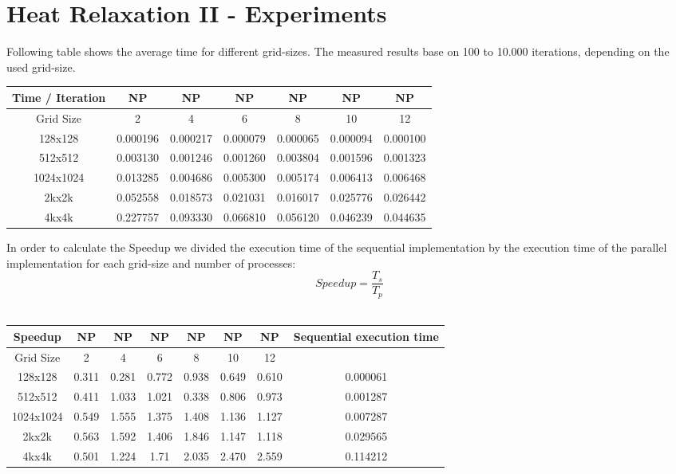 \documentclass{article}
\newcommand{\enterProblemHeader}[1]{
}
\newcommand{\exitProblemHeader}[1]{
}
\newcounter{homeworkProblemCounter} %
\newcommand{\homeworkProblemName}{}
\newenvironment{homeworkProblem}[1][Problem \arabic{homeworkProblemCounter}]{ %
\stepcounter{homeworkProblemCounter} %
\renewcommand{\homeworkProblemName}{#1} %
\section{\homeworkProblemName} %
}{
}
\begin{document}
\begin{homeworkProblem}[Heat Relaxation II - Experiments]
Following table shows the average time for different grid-sizes. The measured results
base on 100 to 10.000 iterations, depending on the used grid-size.\\
\begin{center}
\begin{tabular}{ |c|c|c|c|c|c|c| }
\hline 
\textbf{Time / Iteration} & NP & NP & NP & NP & NP & NP\\
\hline
Grid Size & 2 & 4 & 6 & 8 & 10 & 12\\
\hline
128x128 & 0.000196 & 0.000217 & 0.000079 & 0.000065 & 0.000094 & 0.000100\\ 
\hline
512x512 & 0.003130 & 0.001246 & 0.001260 & 0.003804 & 0.001596 & 0.001323\\ 
\hline
1024x1024 & 0.013285 & 0.004686 & 0.005300 & 0.005174 & 0.006413 & 0.006468 \\ 
\hline
2kx2k & 0.052558 & 0.018573 & 0.021031 & 0.016017 & 0.025776 & 0.026442 \\
\hline
4kx4k & 0.227757 & 0.093330 & 0.066810 & 0.056120 & 0.046239 & 0.044635 \\
\hline
\end{tabular}
\end{center}
In order to calculate the Speedup we divided the execution time of the sequential implementation by the execution time of the parallel implementation for each grid-size and number of processes:
$$Speedup = \frac{T_{s}}{T_{p}}$$ \\
\begin{center}
\begin{tabular}{ |c|c|c|c|c|c|c|c| }
\hline 
\textbf{Speedup} & NP & NP & NP & NP & NP & NP & Sequential execution time\\
\hline
Grid Size & 2 & 4 & 6 & 8 & 10 & 12 &\\
\hline
128x128 & 0.311 & 0.281 & 0.772 & 0.938 & 0.649 & 0.610 & 0.000061\\ 
\hline
512x512 & 0.411 & 1.033 & 1.021 & 0.338 & 0.806 & 0.973 & 0.001287\\ 
\hline
1024x1024 & 0.549 & 1.555 & 1.375 & 1.408 & 1.136 & 1.127 & 0.007287\\ 
\hline
2kx2k & 0.563 & 1.592 & 1.406 & 1.846 & 1.147 & 1.118 & 0.029565\\
\hline
4kx4k & 0.501 & 1.224 & 1.71 & 2.035 & 2.470 & 2.559 & 0.114212\\
\hline
\end{tabular}

\end{center}
\end{homeworkProblem}
\end{document}

